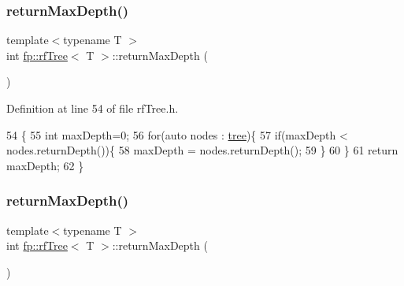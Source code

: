\subsubsection{\texorpdfstring{return\+Max\+Depth()}{returnMaxDepth()}\hspace{0.1cm}{\footnotesize\ttfamily [1/2]}}
{\footnotesize\ttfamily template$<$typename T $>$ \\
int \hyperlink{classfp_1_1rfTree}{fp\+::rf\+Tree}$<$ T $>$\+::return\+Max\+Depth (\begin{DoxyParamCaption}{ }\end{DoxyParamCaption})\hspace{0.3cm}{\ttfamily [inline]}}



Definition at line 54 of file rf\+Tree.\+h.


\begin{DoxyCode}
54                                            \{
55                     \textcolor{keywordtype}{int} maxDepth=0;
56                     \textcolor{keywordflow}{for}(\textcolor{keyword}{auto} nodes : \hyperlink{classfp_1_1rfTree_a1d5c209715f4044a85878c17e2b3ee53}{tree})\{
57                         \textcolor{keywordflow}{if}(maxDepth < nodes.returnDepth())\{
58                             maxDepth = nodes.returnDepth();
59                         \}
60                     \}
61                     \textcolor{keywordflow}{return} maxDepth;
62                 \}
\end{DoxyCode}
\mbox{\label{classfp_1_1rfTree_ab439134c1e24059fe74f84ac8eff78dd}} 
\subsubsection{\texorpdfstring{return\+Max\+Depth()}{returnMaxDepth()}\hspace{0.1cm}{\footnotesize\ttfamily [2/2]}}
{\footnotesize\ttfamily template$<$typename T $>$ \\
int \hyperlink{classfp_1_1rfTree}{fp\+::rf\+Tree}$<$ T $>$\+::return\+Max\+Depth (\begin{DoxyParamCaption}{ }\end{DoxyParamCaption})\hspace{0.3cm}{\ttfamily [inline]}}



